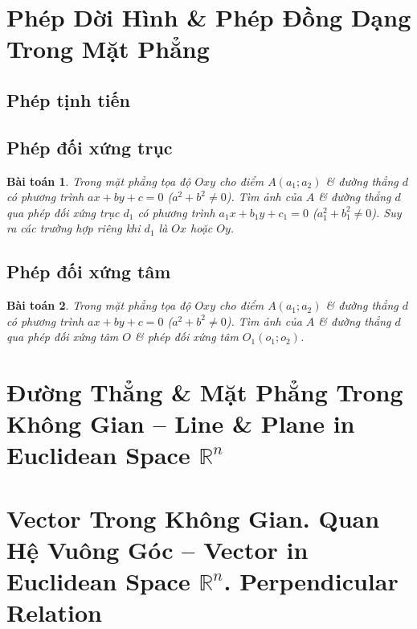 \documentclass{article}
\numberwithin{equation}{section}
\newtheorem{baitoan}{Bài toán}[section]
\begin{document}

\section{Phép Dời Hình \& Phép Đồng Dạng Trong Mặt Phẳng}

\subsection{Phép tịnh tiến}

\subsection{Phép đối xứng trục}

\begin{baitoan}
	Trong mặt phẳng tọa độ $Oxy$ cho điểm $A(a_1;a_2)$ \& đường thẳng $d$ có phương trình $ax + by + c = 0$ ($a^2 + b^2\ne 0$). Tìm ảnh của $A$ \& đường thẳng $d$ qua phép đối xứng trục $d_1$ có phương trình $a_1x + b_1y + c_1 = 0$ ($a_1^2 + b_1^2\ne 0$). Suy ra các trường hợp riêng khi $d_1$ là $Ox$ hoặc $Oy$.
\end{baitoan}

\subsection{Phép đối xứng tâm}

\begin{baitoan}
	Trong mặt phẳng tọa độ $Oxy$ cho điểm $A(a_1;a_2)$ \& đường thẳng $d$ có phương trình $ax + by + c = 0$ ($a^2 + b^2\ne 0$). Tìm ảnh của $A$ \& đường thẳng $d$ qua phép đối xứng tâm $O$ \& phép đối xứng tâm $O_1(o_1;o_2)$.
\end{baitoan}


\section{Đường Thẳng \& Mặt Phẳng Trong Không Gian -- Line \& Plane in Euclidean Space $\mathbb{R}^n$}


\section{Vector Trong Không Gian. Quan Hệ Vuông Góc -- Vector in Euclidean Space $\mathbb{R}^n$. Perpendicular Relation}
\end{document}
